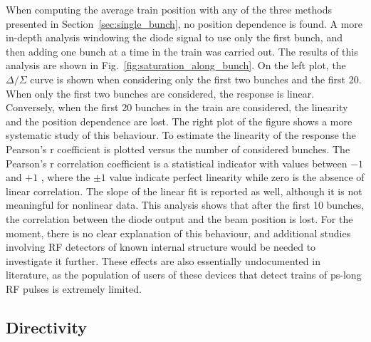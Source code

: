 When computing the average train position with any of the three methods presented in Section~\ref{sec:single_bunch}, no position dependence is found. A more in-depth analysis windowing the diode signal to use only the first bunch, and then adding one bunch at a time in the train was carried out. The results of this analysis are shown in Fig.~\ref{fig:saturation_along_bunch}. On the left plot, the $\Delta/\Sigma$ curve is shown when considering only the first two bunches and the first 20. When only the first two bunches are considered, the response is linear. Conversely, when the first 20 bunches in the train are considered, the linearity and the position dependence are lost. The right plot of the figure shows a more systematic study of this behaviour. To estimate the linearity of the response the Pearson's r coefficient is plotted versus the number of considered bunches. The Pearson's r correlation coefficient is a statistical indicator with values between $-1$ and $+1$ \cite{stat:paper}, where the $\pm1$ value indicate perfect linearity while zero is the absence of linear correlation. The slope of the linear fit is reported as well, although it is not meaningful for nonlinear data. This analysis shows that after the first 10 bunches, the correlation between the diode output and the beam position is lost. For the moment, there is no clear explanation of this behaviour, and additional studies involving RF detectors of known internal structure would be needed to investigate it further. These effects are also essentially undocumented in literature, as the population of users of these devices that detect trains of ps-long RF pulses is extremely limited. 












\subsection{Directivity}\label{sec:directivity}

